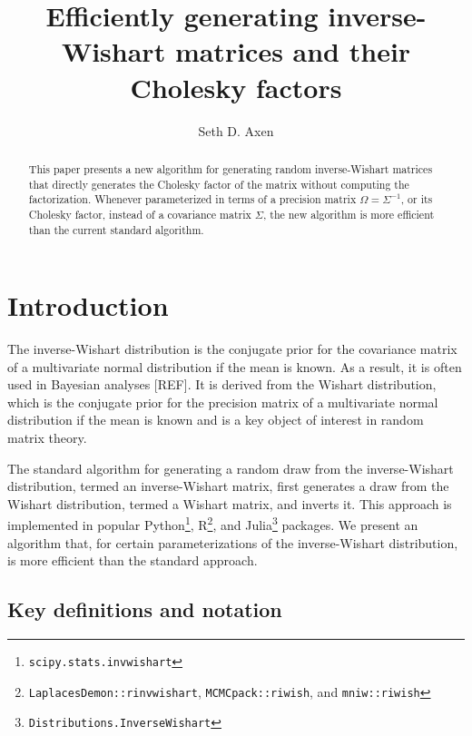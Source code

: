 \documentclass[12pt,a4paper,reqno]{amsart}
\numberwithin{equation}{section}
\begin{document}
\title{Efficiently generating inverse-Wishart matrices and their Cholesky factors}
\author{Seth D. Axen}
\address{University of Tübingen, Germany}

\begin{abstract}
    This paper presents a new algorithm for generating random inverse-Wishart matrices that directly generates the Cholesky factor of the matrix without computing the factorization.
    Whenever parameterized in terms of a precision matrix $\Omega=\Sigma^{-1}$, or its Cholesky factor, instead of a covariance matrix $\Sigma$, the new algorithm is more efficient than the current standard algorithm.
\end{abstract}

\maketitle


\section{Introduction}

The inverse-Wishart distribution is the conjugate prior for the covariance matrix of a multivariate normal distribution if the mean is known.
As a result, it is often used in Bayesian analyses [REF].
It is derived from the Wishart distribution, which is the conjugate prior for the precision matrix of a multivariate normal distribution if the mean is known and is a key object of interest in random matrix theory.

The standard algorithm \parencite{jones_generating_1985} for generating a random draw from the inverse-Wishart distribution, termed an inverse-Wishart matrix, first generates a draw from the Wishart distribution, termed a Wishart matrix, and inverts it.
This approach is implemented in popular Python\footnote{\texttt{scipy.stats.invwishart}}, R\footnote{\texttt{LaplacesDemon::rinvwishart}, \texttt{MCMCpack::riwish}, and \texttt{mniw::riwish}}, and Julia\footnote{\texttt{Distributions.InverseWishart}} packages.
We present an algorithm that, for certain parameterizations of the inverse-Wishart distribution, is more efficient than the standard approach.

\subsection*{Key definitions and notation}
\end{document}
